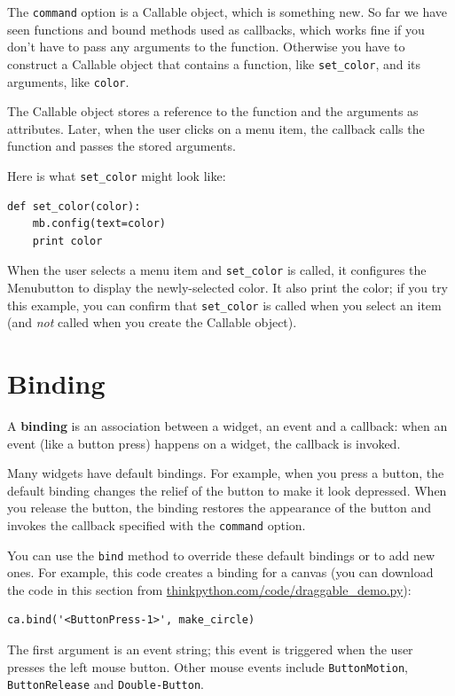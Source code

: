 \documentclass[10pt]{book}
\begin{document}
{

The {\tt command} option is a Callable object, which is something new.
So far we have seen functions and bound methods used as callbacks,
which works fine if you don't have to pass any arguments to
the function.  Otherwise you have to construct a Callable object
that contains a function, like \verb"set_color", and its arguments,
like {\tt color}.

The Callable object stores a reference to the function and the
arguments as attributes.  Later, when the user clicks on a menu
item, the callback calls the function and passes the stored
arguments.

Here is what \verb"set_color" might look like:

\beforeverb
\begin{verbatim}
def set_color(color):
    mb.config(text=color)
    print color
\end{verbatim}
\afterverb
%
When the user selects a menu item and \verb"set_color" is called,
it configures the Menubutton to display the newly-selected color.
It also print the color; if you try this example, you can confirm that
\verb"set_color" is called when you select an item (and {\em not}
called when you create the Callable object).


\section{Binding}


A {\bf binding} is an association between a widget, an event and a
callback: when an event (like a button press) happens on a widget, the
callback is invoked.

Many widgets have default bindings.  For example, when you press
a button, the default binding changes the relief of the button
to make it look depressed.  When you release the button, the
binding restores the appearance of the button and invokes the
callback specified with the {\tt command} option.

You can use the {\tt bind} method to override these default
bindings or to add new ones.  For example, this code creates a
binding for a canvas (you can download the code in this
section from \url{thinkpython.com/code/draggable_demo.py}):

\beforeverb
\begin{verbatim}
ca.bind('<ButtonPress-1>', make_circle)
\end{verbatim}
\afterverb
%
The first argument is an event string; this event is triggered
when the user presses the left mouse button.  Other mouse
events include {\tt ButtonMotion}, {\tt ButtonRelease} and
{\tt Double-Button}.

}
\end{document}
